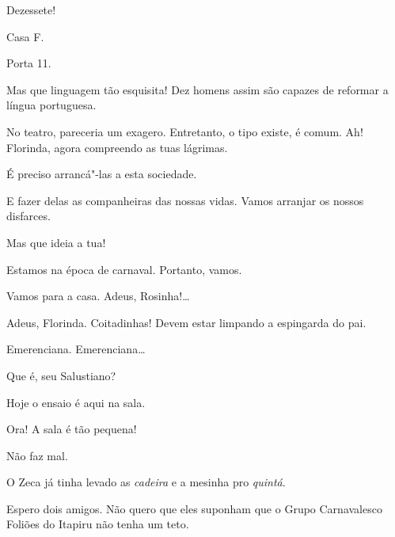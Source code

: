  Dezessete!

 Casa F.

 Porta 11. 




Mas que linguagem tão esquisita! Dez homens
assim são capazes de reformar a língua portuguesa.

 No teatro,
pareceria um exagero. Entretanto, o tipo existe, é comum.
Ah! Florinda, agora compreendo as tuas lágrimas.

  É
preciso arrancá"-las a esta sociedade.

 E fazer delas as
companheiras das nossas vidas. Vamos arranjar os nossos disfarces.

Mas que ideia a tua!

 Estamos na
época de carnaval. Portanto, vamos.

 Vamos para
a casa. Adeus, Rosinha!\ldots

 Adeus, Florinda. Coitadinhas! Devem
estar limpando a espingarda do pai. 








 Emerenciana.
Emerenciana\ldots

  
Que é, seu Salustiano?

  
Hoje o ensaio é aqui na sala.

 Ora! A sala é tão pequena!

 Não faz mal.

 O Zeca
já tinha levado as \textit{cadeira}
e a mesinha pro \textit{quintá}.

 Espero dois amigos. Não
quero que eles suponham que o Grupo Carnavalesco
Foliões do Itapiru não
tenha um teto.

